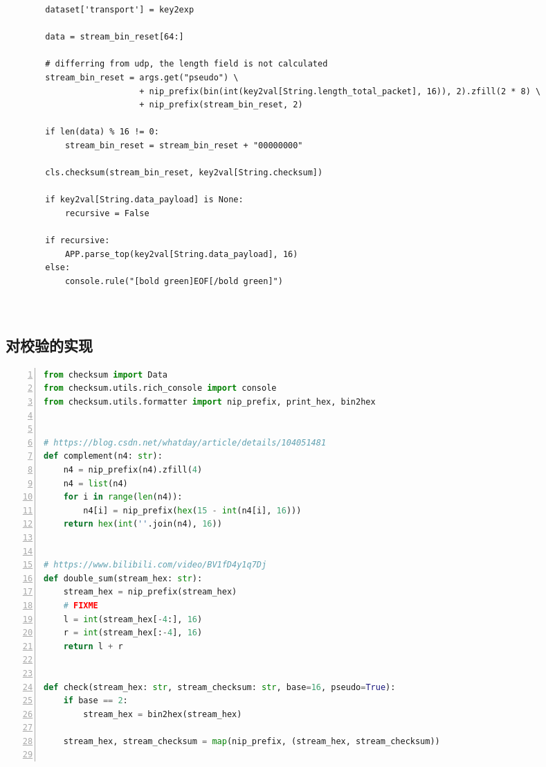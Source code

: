 \documentclass[a4paper,11pt]{article}
\begin{document}
\begin{spacing}{1.2}
\begin{CJK}{UTF8}{gbsn}
\begin{lstlisting}
        dataset['transport'] = key2exp

        data = stream_bin_reset[64:]
        
        # differring from udp, the length field is not calculated
        stream_bin_reset = args.get("pseudo") \
                           + nip_prefix(bin(int(key2val[String.length_total_packet], 16)), 2).zfill(2 * 8) \
                           + nip_prefix(stream_bin_reset, 2)

        if len(data) % 16 != 0:
            stream_bin_reset = stream_bin_reset + "00000000"

        cls.checksum(stream_bin_reset, key2val[String.checksum])

        if key2val[String.data_payload] is None:
            recursive = False

        if recursive:
            APP.parse_top(key2val[String.data_payload], 16)
        else:
            console.rule("[bold green]EOF[/bold green]")

	
\end{lstlisting}

\subsection{对校验的实现}

\begin{lstlisting}[language = Python, numbers=left, numberstyle=\tiny,keywordstyle=\color{blue!70},commentstyle=\color{red!50!green!50!blue!50},frame=shadowbox,rulesepcolor=\color{red!20!green!20!blue!20},basicstyle=\ttfamily]
from checksum import Data
from checksum.utils.rich_console import console
from checksum.utils.formatter import nip_prefix, print_hex, bin2hex


# https://blog.csdn.net/whatday/article/details/104051481
def complement(n4: str):
    n4 = nip_prefix(n4).zfill(4)
    n4 = list(n4)
    for i in range(len(n4)):
        n4[i] = nip_prefix(hex(15 - int(n4[i], 16)))
    return hex(int(''.join(n4), 16))


# https://www.bilibili.com/video/BV1fD4y1q7Dj
def double_sum(stream_hex: str):
    stream_hex = nip_prefix(stream_hex)
    # FIXME
    l = int(stream_hex[-4:], 16)
    r = int(stream_hex[:-4], 16)
    return l + r


def check(stream_hex: str, stream_checksum: str, base=16, pseudo=True):
    if base == 2:
        stream_hex = bin2hex(stream_hex)

    stream_hex, stream_checksum = map(nip_prefix, (stream_hex, stream_checksum))


\end{lstlisting}
\end{CJK}
\end{spacing}
\end{document}
